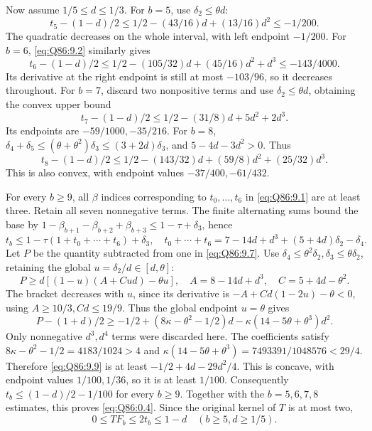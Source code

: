 Now assume \(1/5\le\allowbreak  d\le\allowbreak 1/3\).
For \(b=\allowbreak 5\), use \(\delta_2\le\allowbreak \theta d\):
\[
t_5-(1-d)/2\le1/2-(43/16)d+(13/16)d^2\le-1/200.
\tag{Q86.9.5}\label{eq:Q86:9.5}
\]
The quadratic decreases on the whole interval, with left endpoint \(-1/200\).
For \(b=\allowbreak 6\), \eqref{eq:Q86:9.2} similarly gives
\[
t_6-(1-d)/2\le1/2-(105/32)d+(45/16)d^2+d^3
\le-143/4000.
\tag{Q86.9.6}\label{eq:Q86:9.6}
\]
Its derivative at the right endpoint is still at most \(-103/96\), so it decreases throughout.
For \(b=\allowbreak 7\), discard two nonpositive terms and use \(\delta_2\le\allowbreak \theta d\), obtaining the convex upper bound
\[
t_7-(1-d)/2\le1/2-(31/8)d+5d^2+2d^3.
\]
Its endpoints are \(-59/1000,\allowbreak -35/216\).
For \(b=\allowbreak 8\),
\(\delta_4+\delta_5\le\allowbreak (\theta+\theta^2)\delta_3\le\allowbreak (3+2d)\delta_3\), and
\(5-4d-3d^2>\allowbreak 0\). Thus
\[
t_8-(1-d)/2\le1/2-(143/32)d+(59/8)d^2+(25/32)d^3.
\]
This is also convex, with endpoint values \(-37/400,\allowbreak -61/432\).

For every \(b\ge\allowbreak 9\), all \(\beta\) indices corresponding to
\(t_0,\allowbreak \ldots,\allowbreak t_6\) in \eqref{eq:Q86:9.1} are at least three.
Retain all seven nonnegative terms.
The finite alternating sums bound the base by
\(1-\beta_{b+1}-\beta_{b+2}+\beta_{b+3}\le\allowbreak 1-\tau+\delta_3\), hence
\[
t_b\le1-\tau(1+t_0+\cdots+t_6)+\delta_3,
\quad
t_0+\cdots+t_6=7-14d+d^3+(5+4d)\delta_2-\delta_4.
\tag{Q86.9.7}\label{eq:Q86:9.7}
\]
Let \(P\) be the quantity subtracted from one in \eqref{eq:Q86:9.7}.
Use \(\delta_4\le\allowbreak \theta^2\delta_2,\allowbreak \delta_3\le\allowbreak \theta\delta_2\), retaining the global
\(u=\allowbreak \delta_2/d\in[d,\allowbreak \theta]\):
\[
P\ge d[(1-u)(A+Cud)-\theta u],
\quad A=8-14d+d^3,\quad C=5+4d-\theta^2.
\tag{Q86.9.8}\label{eq:Q86:9.8}
\]
The bracket decreases with \(u\), since its derivative is
\(-A+Cd(1-2u)-\theta<\allowbreak 0\), using \(A\ge\allowbreak 10/3,\allowbreak Cd\le\allowbreak 19/9\).
Thus the global endpoint \(u=\allowbreak \theta\) gives
\[
P-(1+d)/2\ge-1/2+(8\kappa-\theta^2-1/2)d
-\kappa(14-5\theta+\theta^3)d^2.
\tag{Q86.9.9}\label{eq:Q86:9.9}
\]
Only nonnegative \(d^3,\allowbreak d^4\) terms were discarded here.
The coefficients satisfy
\(8\kappa-\theta^2-1/2=\allowbreak 4183/1024>\allowbreak 4\) and
\(\kappa(14-5\theta+\theta^3)=\allowbreak 7493391/1048576<\allowbreak 29/4\).
Therefore \eqref{eq:Q86:9.9} is at least
\(-1/2+4d-29d^2/4\).
This is concave, with endpoint values \(1/100,\allowbreak 1/36\), so it is at least \(1/100\).
Consequently \(t_b\le\allowbreak (1-d)/2-1/100\) for every \(b\ge\allowbreak 9\).
Together with the \(b=\allowbreak 5,\allowbreak 6,\allowbreak 7,\allowbreak 8\) estimates, this proves \eqref{eq:Q86:0.4}.
Since the original kernel of \(T\) is at most two,
\[
\boxed{0\le TF_b\le2t_b\le1-d\quad(b\ge5,d\ge1/5).}
\tag{Q86.9.10}\label{eq:Q86:9.10}
\]

